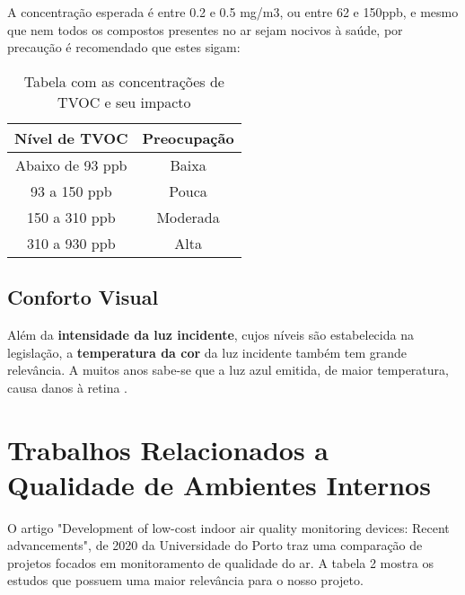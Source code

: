 \documentclass[../monografia.tex]{subfiles}
\begin{document}
A concentração esperada é entre 0.2 e 0.5 mg/m3, ou entre 62 e 150ppb, e mesmo que nem todos os compostos presentes no ar sejam nocivos à saúde, por precaução é recomendado que estes sigam: \cite{tecam}

\begin{table}[h]
\centering
\begin{tabular}{ |c|c| }
\hline
Nível de TVOC	&   Preocupação \\
\hline
Abaixo de 93 ppb  &  Baixa \\
93 a 150 ppb  &   Pouca \\
150 a 310 ppb &  Moderada \\
310 a 930 ppb &  Alta \\
\hline
\end{tabular}
\caption{Tabela com as concentrações de TVOC e seu impacto }
\label{table}
\end{table}

\subsection{Conforto Visual}

Além da \textbf{intensidade da luz incidente}, cujos níveis são estabelecida na legislação, a \textbf{temperatura da cor} da luz incidente também tem grande relevância. A muitos anos sabe-se que a luz azul emitida, de maior temperatura, causa danos à retina \cite{BlueLight}. \par


\section{Trabalhos Relacionados a Qualidade de Ambientes Internos} 

O artigo "Development of low-cost indoor air quality monitoring devices:
Recent advancements", de 2020 da Universidade do Porto \cite{IAQ_Compare} traz uma comparação de projetos focados em monitoramento de qualidade do ar. A tabela 2 mostra os estudos que possuem uma maior relevância para o nosso projeto. 
\end{document}
